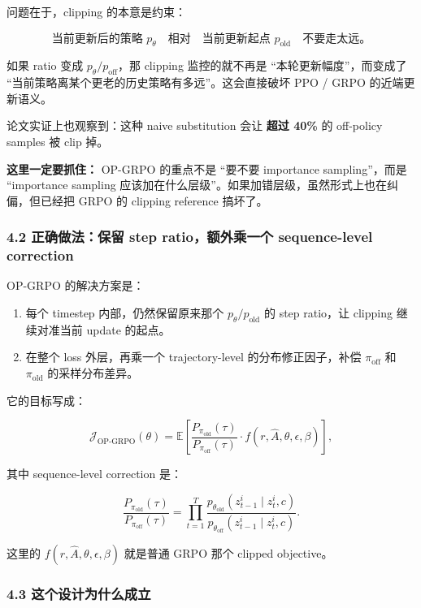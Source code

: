 问题在于，clipping 的本意是约束：

\[
\text{当前更新后的策略 } p_{\theta}
\quad \text{相对} \quad
\text{当前更新起点 } p_{\mathrm{old}}
\quad \text{不要走太远。}
\]

如果 ratio 变成 \(p_{\theta}/p_{\mathrm{off}}\)，那 clipping 监控的就不再是 ``本轮更新幅度''，而变成了 ``当前策略离某个更老的历史策略有多远''。这会直接破坏 PPO / GRPO 的近端更新语义。

论文实证上也观察到：这种 naive substitution 会让 \textbf{超过 40\%} 的 off-policy samples 被 clip 掉。

\begin{warnbox}
\textbf{这里一定要抓住：} OP-GRPO 的重点不是 ``要不要 importance sampling''，而是 ``importance sampling 应该加在什么层级''。如果加错层级，虽然形式上也在纠偏，但已经把 GRPO 的 clipping reference 搞坏了。
\end{warnbox}

\subsubsection{4.2 正确做法：保留 step ratio，额外乘一个 sequence-level correction}

OP-GRPO 的解决方案是：

\begin{enumerate}[leftmargin=1.5em]
  \item 每个 timestep 内部，仍然保留原来那个 \(p_{\theta}/p_{\mathrm{old}}\) 的 step ratio，让 clipping 继续对准当前 update 的起点。
  \item 在整个 loss 外层，再乘一个 trajectory-level 的分布修正因子，补偿 \(\pi_{\mathrm{off}}\) 和 \(\pi_{\mathrm{old}}\) 的采样分布差异。
\end{enumerate}

它的目标写成：

\[
\mathcal{J}_{\mathrm{OP\mbox{-}GRPO}}(\theta)
=
\mathbb{E}
\left[
\frac{P_{\pi_{\mathrm{old}}}(\tau)}{P_{\pi_{\mathrm{off}}}(\tau)}
\cdot
f(r, \hat{A}, \theta, \epsilon, \beta)
\right],
\]

其中 sequence-level correction 是：

\[
\frac{P_{\pi_{\mathrm{old}}}(\tau)}{P_{\pi_{\mathrm{off}}}(\tau)}
=
\prod_{t=1}^{T}
\frac{p_{\theta_{\mathrm{old}}}(z_{t-1}^i \mid z_t^i, c)}{p_{\theta_{\mathrm{off}}}(z_{t-1}^i \mid z_t^i, c)}.
\]

这里的 \(f(r,\hat{A},\theta,\epsilon,\beta)\) 就是普通 GRPO 那个 clipped objective。

\subsubsection{4.3 这个设计为什么成立}

